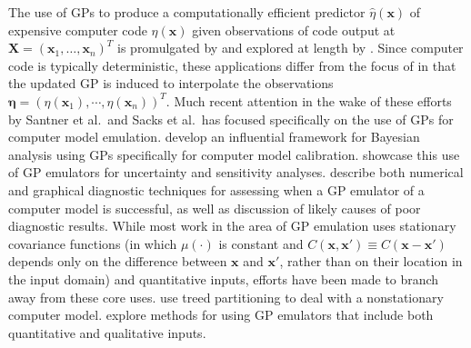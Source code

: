 \documentclass{article}
\begin{document}
The use of GPs to produce a computationally efficient predictor $\hat \eta (\mathbf x)$ of expensive computer code $\eta(\mathbf x)$ given observations of code output at $\mathbf X=(\mathbf x_1,\ldots,\mathbf x_n)^T$ is promulgated by \cite{Sacks1989} and explored at length by \cite{Santner2003a}. Since computer code is typically deterministic, these applications differ from the focus of \cite{OHagan1978} in that the updated GP is induced to interpolate the observations $\boldsymbol \eta = (\eta(\mathbf x_1),\cdots,\eta(\mathbf x_n))^T$. Much recent attention in the wake of these efforts by Santner et al.\ and Sacks et al.\  has focused specifically on the use of GPs for computer model emulation.
\cite{Kennedy2001} develop an influential framework for Bayesian analysis using GPs specifically for computer model calibration. \cite{Kennedy2006} showcase this use of GP emulators for uncertainty and sensitivity analyses. \cite{Bastos2009} describe both numerical and graphical diagnostic techniques for assessing when a GP emulator of a computer model is successful, as well as discussion of likely causes of poor diagnostic results. While most work in the area of GP emulation uses stationary covariance functions (in which $\mu(\cdot)$ is constant and $C(\mathbf x,\mathbf x' )\equiv C(\mathbf x-\mathbf x' )$ depends only on the difference between $\mathbf x$ and $\mathbf x'$, rather than on their location in the input domain) and quantitative inputs, efforts have been made to branch away from these core uses. \cite{Gramacy2008} use treed partitioning to deal with a nonstationary computer model. \cite{Qian2008} explore methods for using GP emulators that include both quantitative and qualitative inputs.
\end{document}
